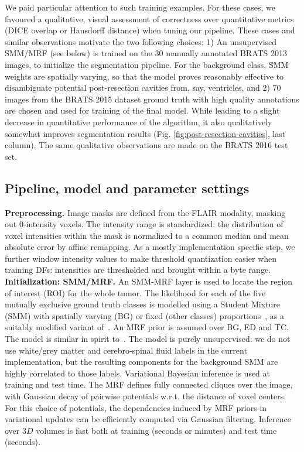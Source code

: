 We paid particular attention to such training examples. For these cases, we favoured a qualitative, visual 
assessment of correctness over quantitative metrics (DICE overlap or Hausdorff distance) when tuning our pipeline. 
These cases and similar observations motivate the two following choices: 1) An unsupervised SMM/MRF (see below) is trained on the $30$ manually annotated BRATS 2013 images, to initialize the segmentation pipeline. For the background class, SMM weights are spatially varying, so that the model proves reasonably effective to disambiguate potential post-resection cavities from, say, ventricles, and 2) $70$ images from the BRATS 2015 dataset ground truth with high quality annotations are chosen and used for training of the final model. While leading to a slight decrease in quantitative performance of the algorithm, it also qualitatively somewhat improves segmentation results (Fig. \ref{fig:post-resection-cavities}, last column). The same qualitative observations are made on the BRATS 2016 test set. 

\subsection{Pipeline, model and parameter settings}

\noindent
\textbf{Preprocessing.} Image masks are defined from the FLAIR modality, masking out $0$-intensity voxels. The intensity range is standardized: the distribution of voxel intensities within the mask is normalized to a common median and mean absolute error by affine remapping. As a mostly implementation specific step, we further window intensity values to make threshold quantization easier when training DFs: intensities are thresholded and brought within a byte range.\\

\noindent
\textbf{Initialization: SMM/MRF.} An SMM-MRF layer is used to locate the region of interest (ROI) for the whole tumor. The likelihood for each of the five mutually exclusive ground truth classes is modelled using a Student Mixture (SMM) with spatially varying (BG) or fixed (other classes) proportions~\cite{archambeau2007robust}, as a suitably modified variant of~\cite{cordier2015patch}. An MRF prior is assumed over BG, ED and TC. The model is similar in spirit to~\cite{zhang2001segmentation,menze2010generative}. The model is purely unsupervised: we do not use white/grey matter and cerebro-spinal fluid labels in the current implementation, but the resulting components for the background SMM are highly correlated to those labels. %
Variational Bayesian inference is used at training and test time. The MRF defines fully connected cliques over the image, with Gaussian decay of pairwise potentials w.r.t. the distance of voxel centers. For this choice of potentials, the dependencies induced by MRF priors in variational updates can be efficiently computed via Gaussian filtering. Inference over $3D$ volumes is fast both at training (seconds or minutes) and test time (seconds).\\

